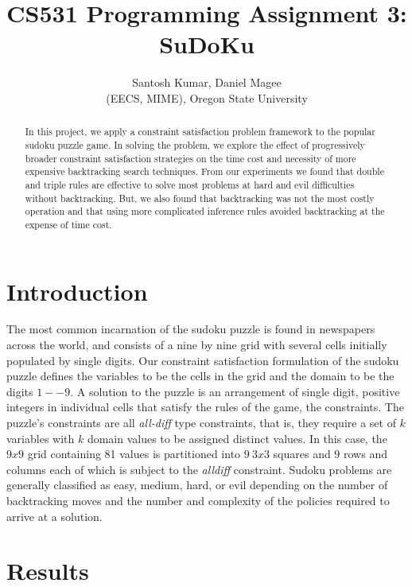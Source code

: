 \documentclass[12pt]{article}
\title{CS531 Programming Assignment 3: SuDoKu}
\author{
	Santosh Kumar, Daniel Magee \\
	(EECS, MIME), Oregon State University\\
}
\begin{document}
	
\maketitle
\begin{abstract}

In this project, we apply a constraint satisfaction problem framework to the popular sudoku puzzle game. 
In solving the problem, we explore the effect of progressively broader constraint satisfaction strategies on the time cost and necessity of more expensive backtracking search techniques.
From our experiments we found that double and triple rules are effective to solve most problems at hard and evil difficulties without backtracking.
But, we also found that backtracking was not the most costly operation and that using more complicated inference rules avoided backtracking at the expense of time cost.

\end{abstract}

\section{Introduction}

The most common incarnation of the sudoku puzzle is found in newspapers across the world, and consists of a nine by nine grid with several cells initially populated by single digits. 
Our constraint satisfaction formulation of the sudoku puzzle defines the variables to be the cells in the grid and the domain to be the digits $1--9$. 
A solution to the puzzle is an arrangement of single digit, positive integers in individual cells that satisfy the rules of the game, the constraints.
The puzzle's constraints are all \textit{all-diff} type constraints, that is, they require a set of $k$ variables with $k$ domain values to be assigned distinct values. 
In this case, the $9x9$ grid containing 81 values is partitioned into $9 ~ 3x3$ squares and $9$ rows and columns each of which is subject to the \textit{alldiff} constraint. 
Sudoku problems are generally classified as easy, medium, hard, or evil depending on the number of backtracking moves and the number and complexity of the policies required to arrive at a solution.



\section{Results}
\end{document}
